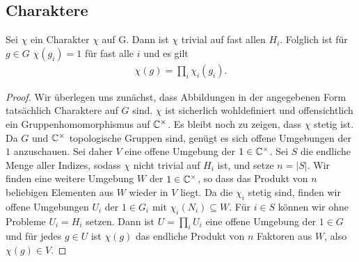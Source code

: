 \subsection{Charaktere}%
		\begin{lemma}
			Sei $\chi$  ein Charakter $\chi$ auf G. Dann ist $\chi$ trivial auf fast allen $H_i$. Folglich ist für $g\in G$ $\chi(g_i) = 1$ für fast alle $i$ und es gilt
			\begin{align*}
				\chi(g) = \prod_i \chi_i(g_i).
			\end{align*}
		\end{lemma}
		\begin{proof}
			Wir überlegen uns zunächst, dass Abbildungen in der angegebenen Form tatsächlich Charaktere auf $G$ sind. 
			$\chi$ ist sicherlich wohldefiniert und offensichtlich ein Gruppenhomomorphismus auf $\mathbb{C}^\times$. 
			Es bleibt noch zu zeigen, dass $\chi$ stetig ist. 
			Da $G$ und $\mathbb{C}^\times$ topologische Gruppen sind, genügt es sich offene Umgebungen der $1$ anzuschauen. Sei daher $V$ eine offene Umgebung der $1 \in \mathbb{C}^\times$.
			Sei $S$ die endliche Menge aller Indizes, sodass $\chi$ nicht trivial auf $H_i$ ist, und setze $n = |S|$. 
			Wir finden eine weitere Umgebung $W$ der $1 \in \mathbb{C}^\times$, so dass das Produkt von $n$ beliebigen Elementen aus $W$ wieder in $V$ liegt. 
			Da die $\chi_i$ stetig sind, finden wir offene Umgebungen $U_i$ der $1 \in G_i$ mit $\chi_i(N_i) \subseteq W$. 
			Für $i \in S$ können wir ohne Probleme $U_i = H_i$ setzen. 
			Dann ist $U = \prod_i U_i$ eine offene Umgebung der $1 \in G$ und für jedes $g \in U$ ist $\chi(g)$ das endliche Produkt von $n$ Faktoren aus $W$, also $\chi(g) \in V$.
			

\end{proof}
